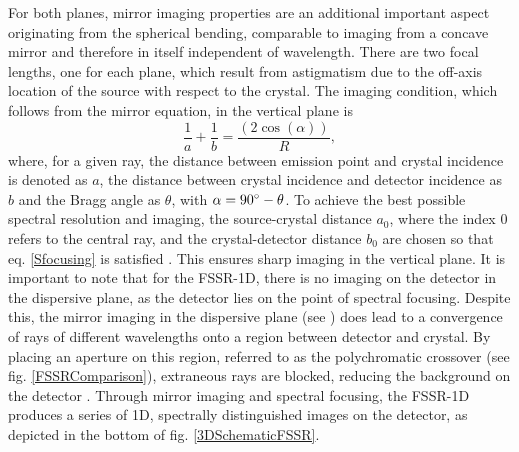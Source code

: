 For both planes, mirror imaging properties are an additional important aspect originating from the spherical bending, comparable to imaging from a concave 
mirror and 
therefore in itself independent of wavelength. There are two focal lengths, one 
for each plane,  
which result from astigmatism due to the off-axis location of the source with 
respect to the 
crystal. The imaging condition, which follows from the mirror equation, in the 
vertical plane is 
\citep{blasco2001portable} 
\begin{equation}
	\frac{1}{a}+\frac{1}{b} = \frac{(2\cos(\alpha))}{R},
	\label{Sfocusing}
\end{equation}
where, for a given ray, the distance between emission point and crystal 
incidence is denoted as 
$a$, the distance between crystal incidence and detector incidence as $b$ and 
the Bragg angle as 
$\theta$, with $\alpha = 
90\degree - \theta$. To achieve the best 
possible spectral resolution and imaging, the source-crystal distance $a_0$, where the 
index 0 refers to the 
central ray, and the crystal-detector distance $b_0$ are chosen 
so that eq. \ref{Sfocusing} is satisfied \citep{blasco2001portable, 
renner2019challenges,faenov1994}. This ensures sharp imaging in the vertical 
plane. It is 
important to note that for the FSSR-1D, there is no imaging on the detector in 
the dispersive 
plane, as the detector lies on the point of spectral focusing. Despite this, 
the mirror imaging in 
the dispersive plane (see \citep{blasco2001portable}) does lead to a 
convergence of rays of 
different wavelengths onto a region between detector and crystal. By placing an 
aperture on this 
region, referred to as the polychromatic crossover (see fig. 
\ref{FSSRComparison}), extraneous 
rays are blocked, reducing the 
background on the detector \citep{renner2019challenges}. Through mirror imaging 
and spectral 
focusing, the FSSR-1D produces a series of 1D, spectrally distinguished images 
on the detector, as 
depicted in the bottom of fig. \ref{3DSchematicFSSR}. 

